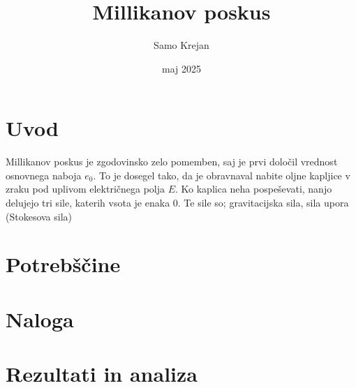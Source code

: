 \documentclass[12pt]{article}
\title{\textbf{Millikanov poskus}}
\author{Samo Krejan}
\date{maj 2025}
\begin{document}
\maketitle

\section{Uvod}

Millikanov poskus je zgodovinsko zelo pomemben, saj je prvi določil vrednost osnovnega naboja $e_0$. To je dosegel tako, da je obravnaval nabite oljne kapljice v zraku pod uplivom električnega polja $E$. Ko kaplica neha pospeševati, nanjo delujejo tri sile, katerih vsota je enaka $0$. Te sile so; gravitacijska sila, sila upora (Stokesova sila)

\section{Potrebščine}


\section{Naloga}


\section{Rezultati in analiza}
\end{document}

